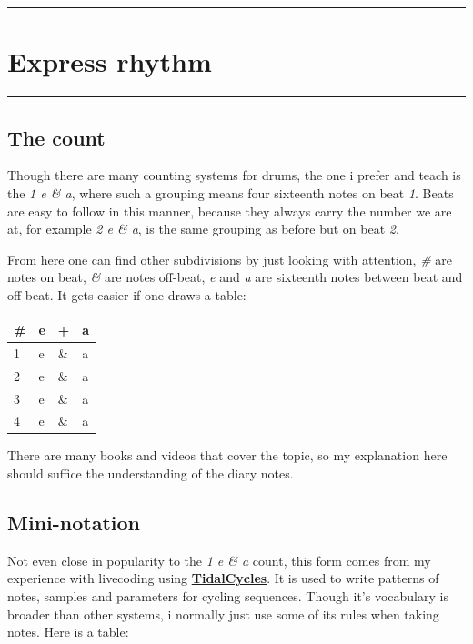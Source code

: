 \documentclass[
]{book}
\begin{document}
\begin{center}\rule{0.5\linewidth}{0.5pt}\end{center}

\hypertarget{Express-rhythm}{%
\chapter{Express rhythm}\label{Express-rhythm}}

\begin{center}\rule{0.5\linewidth}{0.5pt}\end{center}

\hypertarget{the-count}{%
\section*{The count}\label{the-count}}

Though there are many counting systems for drums, the one i prefer and teach is the \emph{1 e \& a}, where such a grouping means four sixteenth notes on beat \emph{1}. Beats are easy to follow in this manner, because they always carry the number we are at, for example \emph{2 e \& a}, is the same grouping as before but on beat \emph{2}.

From here one can find other subdivisions by just looking with attention, \emph{\#} are notes on beat, \emph{\&} are notes off-beat, \emph{e} and \emph{a} are sixteenth notes between beat and off-beat. It gets easier if one draws a table:

\begin{longtable}[]{@{}llll@{}}
\toprule
\# & e & + & a \\
\midrule
\endhead
1 & e & \& & a \\
2 & e & \& & a \\
3 & e & \& & a \\
4 & e & \& & a \\
\bottomrule
\end{longtable}

There are many books and videos that cover the topic, so my explanation here should suffice the understanding of the diary notes.

\hypertarget{mini-notation}{%
\section*{Mini-notation}\label{mini-notation}}

Not even close in popularity to the \emph{1 e \& a} count, this form comes from my experience with livecoding using \textbf{\href{https://tidalcycles.org/}{TidalCycles}}. It is used to write patterns of notes, samples and parameters for cycling sequences. Though it's vocabulary is broader than other systems, i normally just use some of its rules when taking notes. Here is a table:
\end{document}

